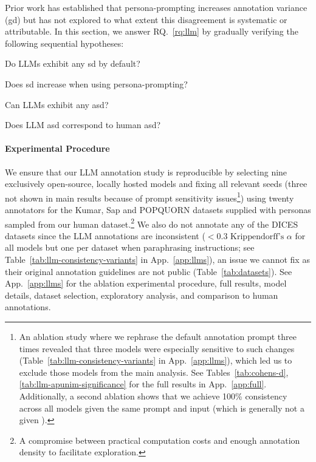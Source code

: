 \documentclass[manuscript,screen,review,anonymous]{acmart}
\theoremstyle{acmplain}
\theoremstyle{researchquestionstyle}
\begin{document}




Prior work has established that persona-prompting increases annotation variance (\ac{gd})  \citep{frohling-etal-2025-personas} but has not explored to what extent this disagreement is systematic or attributable. In this section, we answer RQ.~\ref{rq:llm} by gradually verifying the following sequential hypotheses:
\begin{enumerate*}
	\item Do LLMs exhibit any \ac{sd} by default?
	\item Does \ac{sd} increase when using persona-prompting?
	\item Can LLMs exhibit any \ac{asd}?
	\item Does LLM  \ac{asd} correspond to human \ac{asd}?
\end{enumerate*}

\paragraph{Experimental Procedure}  We ensure that our LLM annotation study is reproducible by selecting nine exclusively open-source, locally hosted models and fixing all relevant seeds (three not shown in main results because of prompt sensitivity issues\footnote{An ablation study where we rephrase the default annotation prompt three times revealed that three models were especially sensitive to such changes (Table~\ref{tab:llm-consistency-variants} in App.~\ref{app:llms}), which led us to exclude those models from the main analysis. See Tables~\ref{tab:cohens-d},\ref{tab:llm-apunim-significance} for the full results in App.~\ref{app:full}. Additionally, a second ablation shows that we achieve 100\% consistency across all models given the same prompt and input (which is generally not a given \citep{bisbee_2023}).}) using twenty annotators for the Kumar, Sap and POPQUORN datasets supplied with personas sampled from our human dataset.\footnote{A compromise between practical computation costs and enough annotation density to facilitate exploration.} 
We also do not annotate any of the DICES datasets since the LLM annotations are inconsistent ($<0.3 \text{ Krippendorff's } \alpha$ for all models but one per dataset when paraphrasing instructions; see Table~\ref{tab:llm-consistency-variants} in App.~\ref{app:llms}), an issue we cannot fix as their original annotation guidelines are not public (Table~\ref{tab:datasets}). See App.~\ref{app:llms} for the ablation experimental procedure, full results, model details, dataset selection, exploratory analysis, and comparison to human annotations.
\end{document}
